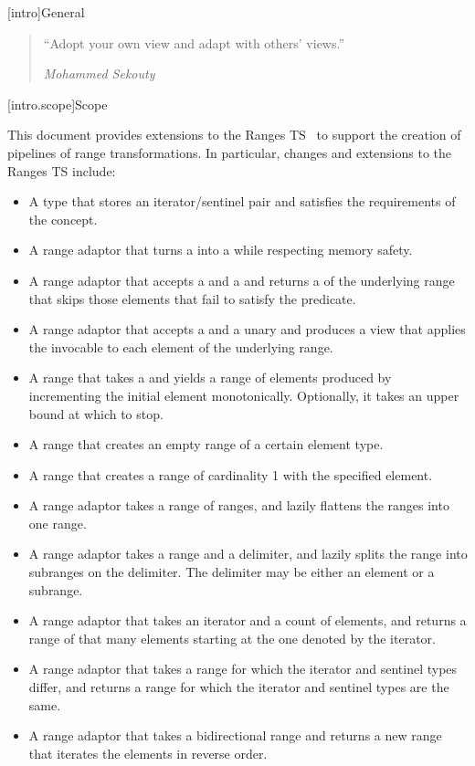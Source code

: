 [intro]{General}

\begin{quote}
``Adopt your own view and adapt with others' views.''
\begin{flushright}
\textemdash \textit{Mohammed Sekouty}
\end{flushright}
\end{quote}

[intro.scope]{Scope}

\pnum
This document provides extensions to the Ranges TS~\cite{ranges-ts} to
support the creation of pipelines of range transformations. In particular,
changes and extensions to the Ranges TS include:

\begin{itemize}
\item A  type that stores an
iterator/sentinel pair and satisfies the requirements of the  concept.
\item A  range adaptor that turns a  into a
 while respecting memory safety.
\item A  range adaptor that accepts a  and a
 and returns a  of the underlying range that skips
those elements that fail to satisfy the predicate.
\item A  range adaptor that accepts a  and a
unary  and produces a view that applies the invocable to each
element of the underlying range.
\item A  range that takes a  and
yields a range of elements produced by incrementing the initial element
monotonically. Optionally, it takes an upper bound at which to stop.
\item A  range that creates an empty range of a certain
element type.
\item A  range that creates a range of cardinality 1 with
the specified element.
\item A  range adaptor takes a range of ranges,
and lazily flattens the ranges into one range.
\item A  range adaptor takes a range and a delimiter,
and lazily splits the range into subranges on the delimiter. The delimiter may
be either an element or a subrange.
\item A  range adaptor that takes an iterator and a count
of elements, and returns a range of that many elements starting at the one
denoted by the iterator.
\item A  range adaptor that takes a range for which the
iterator and sentinel types differ, and returns a range for which the iterator
and sentinel types are the same.
\item A  range adaptor that takes a bidirectional range and
returns a new range that iterates the elements in reverse order.
\end{itemize}

